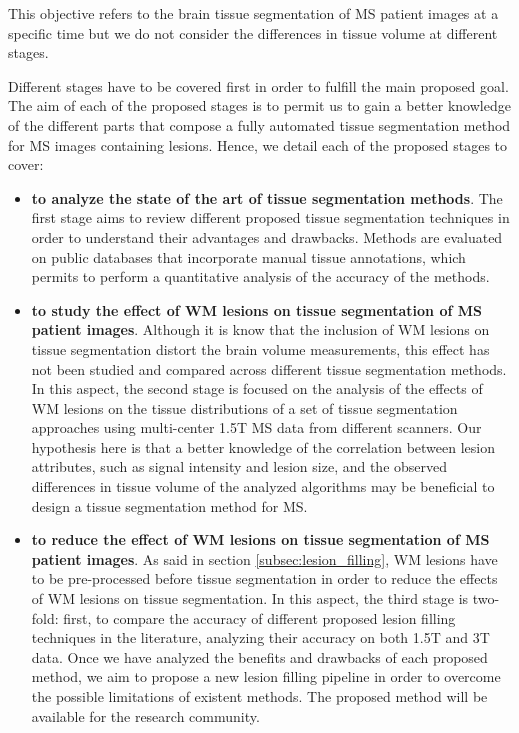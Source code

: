 \noindent This objective refers to the brain tissue segmentation of MS patient images at a specific time but we do not consider the differences in tissue volume at different stages. 

Different stages have to be covered first in order to fulfill the main proposed goal. The aim of each of the proposed stages is to permit us to gain a better knowledge of the different parts that compose a fully automated tissue segmentation method for MS images containing lesions. Hence, we detail each of the proposed stages to cover: 

\begin{itemize}

\item \textbf{to analyze the state of the art of tissue segmentation methods}. The first stage aims to review different proposed tissue segmentation techniques in order to understand their advantages and drawbacks. Methods are evaluated on public databases that incorporate manual tissue annotations, which permits to perform a quantitative analysis of the accuracy of the methods.
  
\item \textbf{to study the effect of WM lesions on tissue segmentation of MS patient images}. Although it is know that the inclusion of WM lesions on tissue segmentation distort the brain volume measurements, this effect has not been studied and compared across different tissue segmentation methods. In this aspect, the second stage is focused on the analysis of the effects of WM lesions on the tissue distributions of a set of tissue segmentation approaches using multi-center 1.5T MS data from different scanners. Our hypothesis here is that a better knowledge of the correlation between lesion attributes, such as signal intensity and lesion size, and the observed differences in tissue volume of the analyzed algorithms may be beneficial to design a tissue segmentation method for MS. 

\item \textbf{to reduce the effect of WM lesions on tissue segmentation of MS patient images}. As said in section \ref{subsec:lesion_filling}, WM lesions have to be pre-processed before tissue segmentation in order to reduce the effects of WM lesions on tissue segmentation. In this aspect, the third stage is two-fold: first, to compare the accuracy of different proposed lesion filling techniques in the literature, analyzing their accuracy on both 1.5T and 3T data. Once we have analyzed the benefits and drawbacks of each proposed method, we aim to propose a new lesion filling pipeline in order to overcome the possible limitations of existent methods. The proposed method will be available for the research community. 


\end{itemize}
